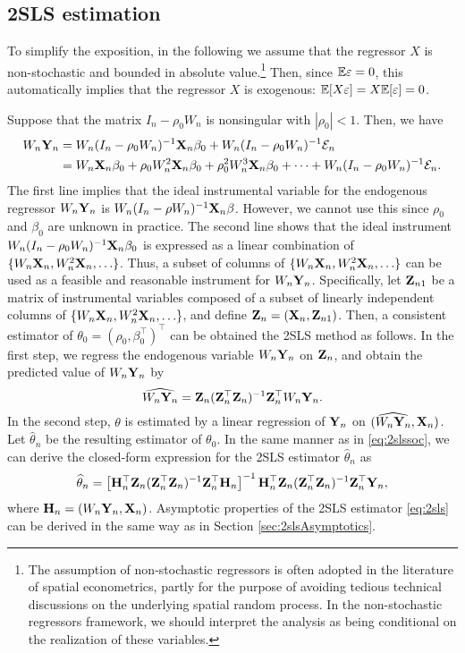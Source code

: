 \documentclass[11pt, A4paper, openany, uplatex]{book}
\begin{document}
\subsection{2SLS estimation}\label{subsec:2sls}

To simplify the exposition, in the following we assume that the regressor $X$ is non-stochastic and bounded in absolute value.\footnote{
	The assumption of non-stochastic regressors is often adopted in the literature of spatial econometrics, partly for the purpose of avoiding tedious technical discussions on the underlying spatial random process.
	In the non-stochastic regressors framework, we should interpret the analysis as being conditional on the realization of these variables.
}
Then, since $\mathbb{E} \varepsilon  = 0$, this automatically implies that the regressor $X$ is exogenous: $\mathbb{E}[X\varepsilon] = X \mathbb{E}[\varepsilon] = 0$.

Suppose that the matrix $I_n - \rho_0 W_n$ is nonsingular with $|\rho_0| < 1$.
Then, we have
\begin{align*}
	W_n \mathbf{Y}_n 
	& = W_n(I_n - \rho_0 W_n)^{-1}\mathbf{X}_n\beta_0 + W_n (I_n - \rho_0 W_n)^{-1}\mathcal{E}_n\\
	& = W_n\mathbf{X}_n\beta_0 + \rho_0 W^2_n\mathbf{X}_n\beta_0 + \rho^2_0 W^3_n\mathbf{X}_n\beta_0 + \cdots +  W_n (I_n - \rho_0 W_n)^{-1}\mathcal{E}_n.
\end{align*}
The first line implies that the ideal instrumental variable for the endogenous regressor $W_n\mathbf{Y}_n$ is $W_n(I_n - \rho W_n)^{-1}\mathbf{X}_n\beta$.
However, we cannot use this since $\rho_0$ and $\beta_0$ are unknown in practice.
The second line shows that the ideal instrument $W_n(I_n - \rho_0 W_n)^{-1}\mathbf{X}_n\beta_0$ is expressed as a linear combination of $\{W_n\mathbf{X}_n, W^2_n\mathbf{X}_n, \ldots\}$.
Thus, a subset of columns of $\{W_n\mathbf{X}_n, W^2_n\mathbf{X}_n, \ldots\}$ can be used as a feasible and reasonable instrument for $W_n\mathbf{Y}_n$.
Specifically, let $\mathbf{Z}_{n1}$ be a matrix of instrumental variables composed of a subset of linearly independent columns of $\{W_n\mathbf{X}_n, W^2_n\mathbf{X}_n, \ldots\}$, and define $\mathbf{Z}_n = (\mathbf{X}_n, \mathbf{Z}_{n1})$.
Then, a consistent estimator of $\theta_0 = (\rho_0, \beta_0^\top)^\top$ can be obtained the 2SLS method as follows.
In the first step, we regress the endogenous variable $W_n \mathbf{Y}_n$ on $\mathbf{Z}_n$, and obtain the predicted value of $W_n\mathbf{Y}_n$ by 
\[
	\widehat{W_n\mathbf{Y}_n} = \mathbf{Z}_n(\mathbf{Z}_n^\top \mathbf{Z}_n)^{-1}\mathbf{Z}_n^\top W_n \mathbf{Y}_n.
\]
In the second step, $\theta$ is estimated by a linear regression of $\mathbf{Y}_n$ on $(\widehat{W_n\mathbf{Y}_n}, \mathbf{X}_n)$.
Let $\hat \theta_n$ be the resulting estimator of $\theta_0$.
In the same manner as in \eqref{eq:2slssoc}, we can derive the closed-form expression for the 2SLS estimator $\hat \theta_n$ as
\begin{align}\label{eq:2sls}
	\widehat \theta_n = \left[\mathbf{H}_n^\top \mathbf{Z}_n(\mathbf{Z}_n^\top \mathbf{Z}_n)^{-1}\mathbf{Z}_n^\top \mathbf{H}_n  \right]^{-1}\mathbf{H}_n^\top \mathbf{Z}_n(\mathbf{Z}_n^\top \mathbf{Z}_n)^{-1}\mathbf{Z}_n^\top\mathbf{Y}_n,
\end{align}
 where $\mathbf{H}_n = (W_n\mathbf{Y}_n, \mathbf{X}_n)$. 
Asymptotic properties of the 2SLS estimator \eqref{eq:2sls} can be derived in the same way as in Section \ref{sec:2slsAsymptotics}.
\end{document}
